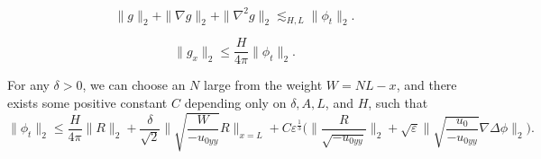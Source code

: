 \documentclass[10pt,a4paper]{amsart}
\begin{document}
\begin{equation}\label{est:g_basic}
\|g\|_2 + \| \nabla g\|_2 + \| \nabla^2 g\|_2 \lesssim_{H,L} \| \phi_t\|_2.
\end{equation}

\begin{lemma}
\begin{equation}\label{est:g_x}
\|g_x\|_2 \le \frac{H}{4\pi} \|\phi_t\|_2.
\end{equation}
\end{lemma}

\begin{proposition}\label{prop:phi_t}
For any $\delta > 0$, we can choose an $N$ large from the weight $W = NL - x$, and there exists some positive constant $C$ depending only on $\delta, A, L$, and $H$, such that
\begin{equation}\label{est:phi_t}
\|\phi_t\|_2 \le \frac{H}{4\pi}\|R\|_2 + \frac{\delta}{\sqrt{2}} \| \sqrt{\frac{W}{-u_{0yy}}} R\|_{x= L} + C \varepsilon^{\frac{1}{3}}  \Big( \|\frac{R}{\sqrt{-u_{0yy}}}\|_2 + \sqrt{\varepsilon} \| \sqrt{\frac{u_0}{-u_{0yy}}} \nabla \Delta \phi\|_2\Big).
\end{equation}
\end{proposition}
\end{document}
